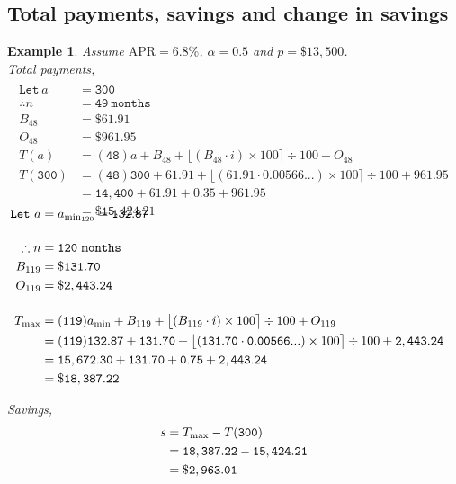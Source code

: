 \documentclass[12pt,letterpaper,oneside]{article}
\newtheorem{example}{Example}[section]
\theoremstyle{remark} %
\begin{document}
	\newpage
	\subsection{Total payments, savings and change in savings}
	\setcounter{example}{0} %
	\begin{example}
	Assume $\mbox{APR}=6.8\%$, $\alpha=0.5$ and $p=\$13,500$.\\[12pt]
	Total payments,
	\begin{align*}
	\\\mathtt{Let\ } a&=\mathtt{300}\\[12pt]
	\therefore n&=\mathtt{49\ months}\\
	B_{48}&=\mathtt{\$61.91}\\
	O_{48}&=\mathtt{\$961.95}\\[12pt]
	T(a)&=(\mathtt{48}) a+B_{48}+\big\lfloor{\left(B_{48}\cdot i\right)\times 100}\big\rceil\div 100+O_{48}\\
	T(\mathtt{300})&=(\mathtt{48}) \mathtt{300}+\mathtt{61.91}+\big\lfloor{\left(\mathtt{61.91}\cdot \mathtt{0.00566...}\right)\times 100}\big\rceil\div 100+\mathtt{961.95}\\
	&=\mathtt{14,400}+\mathtt{61.91}+\mathtt{0.35}+\mathtt{961.95}\\
	&=\mathtt{\$15,424.21}
	\end{align*}

	\label{amina}
	\begin{align*}\\[-36pt]
	\mathtt{Let\ } a&=a_{\rm{min_{120}}}=\mathtt{132.87}\\[12pt]
	\therefore n&=\mathtt{120\ months}\\
	B_{119}&=\mathtt{\$131.70}\\
	O_{119}&=\mathtt{\$2,443.24}\\[12pt]	
	T_{\rm{max}}&=(\mathtt{119}) a_{\rm{min}}+B_{119}+\big\lfloor{\left(B_{119}\cdot i\right)\times 100}\big\rceil\div 100+O_{119}\\
	&=(\mathtt{119}) \mathtt{132.87}+\mathtt{131.70}+\big\lfloor{\left(\mathtt{131.70}\cdot \mathtt{0.00566...}\right)\times 100}\big\rceil\div 100+\mathtt{2,443.24}\\
	&=\mathtt{15,672.30}+\mathtt{131.70}+\mathtt{0.75}+\mathtt{2,443.24}\\
	&=\mathtt{\$18,387.22}
	\end{align*}

	\vspace{12pt}
	Savings,
	\begin{align*}
	s&=T_{\rm{max}}-T(\mathtt{300})\\
	&=\mathtt{18,387.22}-\mathtt{15,424.21}\\
	&=\mathtt{\$2,963.01}
	\end{align*}


\end{example}
\end{document}
